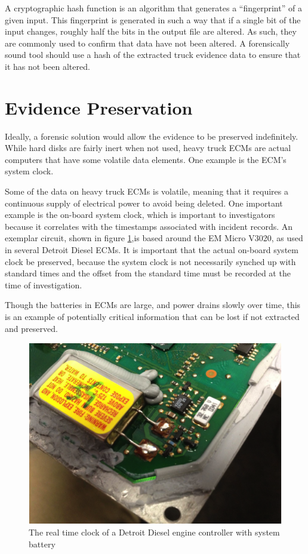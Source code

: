 \documentclass{report}
\begin{document}
A cryptographic hash function is an algorithm that generates a “fingerprint” of a given input. This fingerprint is generated in such a way that if a single bit of the input changes, 
roughly half the bits in the output file are altered\cite{schneier1996}. As such, they are commonly used to confirm that data have not been altered. A forensically sound tool should use a hash of 
the extracted truck evidence data to ensure that it has not been altered.

\section{Evidence Preservation}

Ideally, a forensic solution would allow the evidence to be preserved indefinitely. While hard disks are fairly inert when not used, heavy truck ECMs are actual computers that 
have some volatile data elements. One example is the ECM's system clock.

Some of the data on heavy truck ECMs is volatile, meaning that it requires a continuous supply of electrical power to avoid being deleted. One important example is the on-board 
system clock, which is important to investigators because it correlates with the timestamps associated with incident records. An exemplar circuit, shown in figure \ref{fig:clockbatt},is based around 
the EM Micro V3020, as used in several Detroit Diesel ECMs.  It is important that the actual on-board system clock be preserved, because the system clock is not necessarily synched 
up with standard times and the offset from the standard time must be recorded at the time of investigation.

Though the batteries in ECMs are large, and power drains slowly over time, this is an example of potentially critical information that can be lost if not extracted and preserved.

\begin{figure}[h]
  \centering
  \includegraphics{clockbatt}
  \caption{The real time clock of a Detroit Diesel engine controller with system battery}
  \label{fig:clockbatt}

\end{figure}
\end{document}
